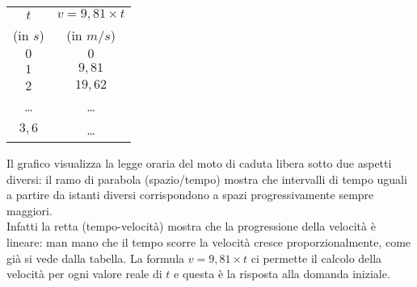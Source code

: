  \begin{minipage}{0.3\textwidth}
 \begin{center}
\begin{tabular}{cc}\toprule
\(t\)        & \(v=9,81\times t\)  \\
(in \(s\))   &   (in \(m/s\)) \\\midrule
\(0\)        & \(0\)  \\
\(1\)        & \(9,81\) \\
\(2\)        & \(19,62\) \\
\dots        & \dots \\
\(3,6\)      & \dots  \\\bottomrule
\end{tabular}
\label{tab:diff_velocita}
\end{center}
 \end{minipage}
  \hfill
 \begin{minipage}{.68 \textwidth}
 \end{minipage}

Il grafico visualizza la legge oraria del 
moto di caduta libera sotto due aspetti diversi: il ramo di parabola 
(spazio/tempo) mostra che intervalli di tempo uguali a partire da istanti 
diversi corrispondono a spazi progressivamente sempre maggiori. \\
Infatti la retta (tempo-velocità) mostra che la progressione della 
velocità è lineare: man mano che il tempo 
scorre la velocità cresce proporzionalmente, come già si vede dalla tabella.
La formula \(v=9,81\times t\) ci permette il calcolo della velocità per 
ogni valore reale di \(t\) e questa è la risposta alla domanda iniziale. 

